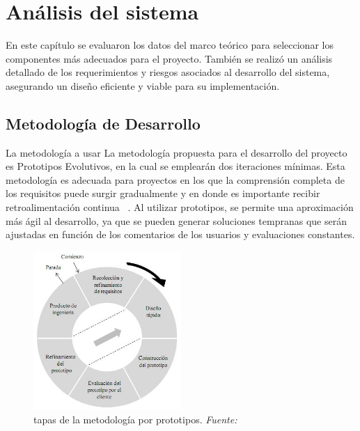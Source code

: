 \chapter{Análisis del sistema}\label{ch:Análisis y diseño del sistema}
En este capítulo se evaluaron los datos del marco teórico para seleccionar los componentes más adecuados para el proyecto. También se realizó un análisis detallado de los requerimientos y riesgos asociados al desarrollo del sistema, asegurando un diseño eficiente y viable para su implementación.

\section{Metodología de Desarrollo}
La metodología a usar	La metodología propuesta para el desarrollo del proyecto es Prototipos Evolutivos, en la cual se emplearán dos iteraciones mínimas. Esta metodología es adecuada para proyectos en los que la comprensión completa de los requisitos puede surgir gradualmente y en donde es importante recibir retroalimentación continua ~\cite{MetodologíasDeDesarrollo2015}. Al utilizar prototipos, se permite una aproximación más ágil al desarrollo, ya que se pueden generar soluciones tempranas que serán ajustadas en función de los comentarios de los usuarios y evaluaciones constantes.

\begin{figure}[H]
	\centering
	\includegraphics[width=0.5\textwidth]{img/chapter04/prototipo.png}
	\caption[Etapas de la metodología por prototipos.]{tapas de la metodología por prototipos. \textit{Fuente: ~\cite{MetodologíasDeDesarrollo2015}}}
	\label{fig:prototpios-metodología}  %
\end{figure}

